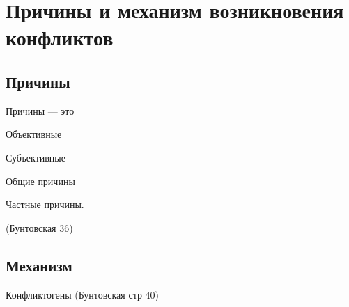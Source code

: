 \chapter{Причины и механизм возникновения конфликтов}

\section{Причины}
Причины --- это

Объективные

Субъективные

Общие причины

Частные причины.

(Бунтовская 36)

\section{Механизм}

Конфликтогены (Бунтовская стр 40)

